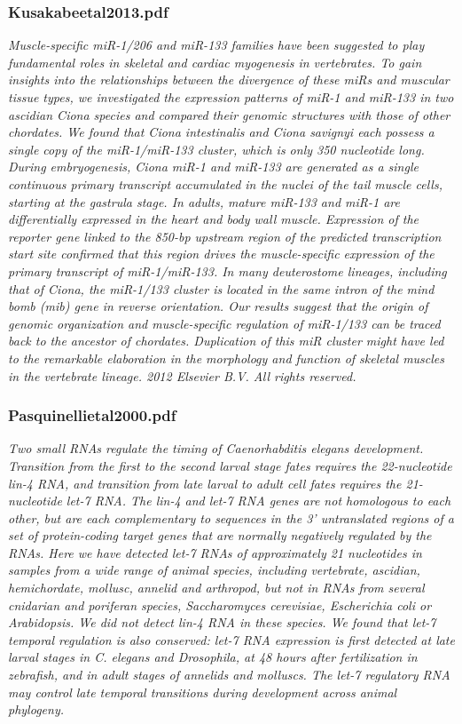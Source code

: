 \documentclass[graybox]{svmult}
\begin{document}
\subsubsection{Kusakabeetal2013.pdf}
\cite{Kusakabe2013}
\textit{Muscle-specific miR-1/206 and miR-133 families have been suggested to 
play fundamental roles in skeletal and cardiac myogenesis in vertebrates. To 
gain insights into the relationships between the divergence of these miRs and 
muscular tissue types, we investigated the expression patterns of miR-1 and 
miR-133 in two ascidian Ciona species and compared their genomic structures with 
those of other chordates. We found that Ciona intestinalis and Ciona savignyi 
each possess a single copy of the miR-1/miR-133 cluster, which is only 350 
nucleotide long. During embryogenesis, Ciona miR-1 and miR-133 are generated as 
a single continuous primary transcript accumulated in the nuclei of the tail 
muscle cells, starting at the gastrula stage. In adults, mature miR-133 and 
miR-1 are differentially expressed in the heart and body wall muscle. Expression 
of the reporter gene linked to the 850-bp upstream region of the predicted 
transcription start site confirmed that this region drives the muscle-specific 
expression of the primary transcript of miR-1/miR-133. In many deuterostome 
lineages, including that of Ciona, the miR-1/133 cluster is located in the same 
intron of the mind bomb (mib) gene in reverse orientation. Our results suggest 
that the origin of genomic organization and muscle-specific regulation of 
miR-1/133 can be traced back to the ancestor of chordates. Duplication of this 
miR cluster might have led to the remarkable elaboration in the morphology and 
function of skeletal muscles in the vertebrate lineage. {\textcopyright} 2012 
Elsevier B.V. All rights reserved.}

\subsubsection{Pasquinellietal2000.pdf}

\cite{Pasquinelli2000}
\textit{Two small RNAs regulate the timing of Caenorhabditis elegans 
development. Transition from the first to the second larval stage fates requires 
the 22-nucleotide lin-4 RNA, and transition from late larval to adult cell fates 
requires the 21-nucleotide let-7 RNA. The lin-4 and let-7 RNA genes are not 
homologous to each other, but are each complementary to sequences in the 3' 
untranslated regions of a set of protein-coding target genes that are normally 
negatively regulated by the RNAs. Here we have detected let-7 RNAs of 
approximately 21 nucleotides in samples from a wide range of animal species, 
including vertebrate, ascidian, hemichordate, mollusc, annelid and arthropod, 
but not in RNAs from several cnidarian and poriferan species, Saccharomyces 
cerevisiae, Escherichia coli or Arabidopsis. We did not detect lin-4 RNA in 
these species. We found that let-7 temporal regulation is also conserved: let-7 
RNA expression is first detected at late larval stages in C. elegans and 
Drosophila, at 48 hours after fertilization in zebrafish, and in adult stages of 
annelids and molluscs. The let-7 regulatory RNA may control late temporal 
transitions during development across animal phylogeny.}
\end{document}
